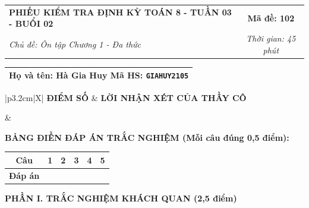 \documentclass[12pt,a4paper]{article}
\begin{document}
\newpage


\noindent
\begin{tabularx}{\linewidth}{|X|c|}
\hline
\textbf{PHIẾU KIỂM TRA ĐỊNH KỲ TOÁN 8 - TUẦN 03 - BUỔI 02} & \textbf{Mã đề: 102} \\
\textit{Chủ đề: Ôn tập Chương 1 - Đa thức} & \textit{Thời gian: 45 phút} \\
\hline
\end{tabularx}

\vspace{1mm}

\noindent
\begin{tabularx}{\linewidth}{|X|}
\hline
\rule[-2mm]{0pt}{7.5mm}\textbf{Họ và tên:} \textbf{\large Hà Gia Huy} \hfill \textbf{Mã HS:} \texttt{GIAHUY2105} \quad \\
\hline
\end{tabularx}

\vspace{1mm}

\noindent
\begin{tabularx}{\linewidth}{|p{3.2cm}|X|}
\hline
\centering\textbf{ĐIỂM SỐ} & \centering\textbf{LỜI NHẬN XÉT CỦA THẦY CÔ} \tabularnewline
\hline
\rule{0pt}{1.3cm} & \tabularnewline
\hline
\end{tabularx}

\vspace{1.2mm}

\noindent\textbf{BẢNG ĐIỀN ĐÁP ÁN TRẮC NGHIỆM (Mỗi câu đúng 0,5 điểm):}
\vspace{0.8mm}

\noindent
\renewcommand{\arraystretch}{1.35}
\begin{tabularx}{\linewidth}{|c|*{5}{>{\centering\arraybackslash}X|}}
\hline
\textbf{Câu} & \textbf{1} & \textbf{2} & \textbf{3} & \textbf{4} & \textbf{5} \\
\hline
\textbf{Đáp án} & & & & & \\
\hline
\end{tabularx}
\renewcommand{\arraystretch}{1.0}

\vspace{1.5mm}

\noindent\textbf{\large PHẦN I. TRẮC NGHIỆM KHÁCH QUAN (2,5 điểm)}
\vspace{1mm}
\end{document}
